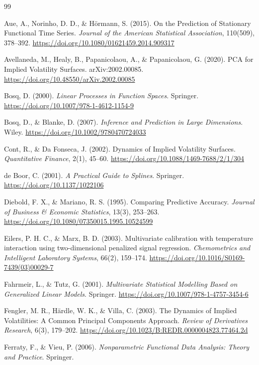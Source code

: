 \documentclass[12pt,a4paper]{article}
\begin{document}
\begin{thebibliography}{99}

Aue, A., Norinho, D. D., \& Hörmann, S. (2015). On the Prediction of Stationary Functional Time Series. \emph{Journal of the American Statistical Association}, 110(509), 378--392. \url{https://doi.org/10.1080/01621459.2014.909317}

Avellaneda, M., Healy, B., Papanicolaou, A., \& Papanicolaou, G. (2020). PCA for Implied Volatility Surfaces. arXiv:2002.00085. \url{https://doi.org/10.48550/arXiv.2002.00085}

Bosq, D. (2000). \emph{Linear Processes in Function Spaces}. Springer. \url{https://doi.org/10.1007/978-1-4612-1154-9}

Bosq, D., \& Blanke, D. (2007). \emph{Inference and Prediction in Large Dimensions}. Wiley. \url{https://doi.org/10.1002/9780470724033}

Cont, R., \& Da Fonseca, J. (2002). Dynamics of Implied Volatility Surfaces. \emph{Quantitative Finance}, 2(1), 45--60. \url{https://doi.org/10.1088/1469-7688/2/1/304}

de Boor, C. (2001). \emph{A Practical Guide to Splines}. Springer. \url{https://doi.org/10.1137/1022106}

Diebold, F. X., \& Mariano, R. S. (1995). Comparing Predictive Accuracy. \emph{Journal of Business \& Economic Statistics}, 13(3), 253--263. \url{https://doi.org/10.1080/07350015.1995.10524599}

Eilers, P. H. C., \& Marx, B. D. (2003). Multivariate calibration with temperature interaction using two-dimensional penalized signal regression. \emph{Chemometrics and Intelligent Laboratory Systems}, 66(2), 159--174. \url{https://doi.org/10.1016/S0169-7439(03)00029-7}

Fahrmeir, L., \& Tutz, G. (2001). \emph{Multivariate Statistical Modelling Based on Generalized Linear Models}. Springer. \url{https://doi.org/10.1007/978-1-4757-3454-6}

Fengler, M. R., Härdle, W. K., \& Villa, C. (2003). The Dynamics of Implied Volatilities: A Common Principal Components Approach. \emph{Review of Derivatives Research}, 6(3), 179--202. \url{https://doi.org/10.1023/B:REDR.0000004823.77464.2d}

Ferraty, F., \& Vieu, P. (2006). \emph{Nonparametric Functional Data Analysis: Theory and Practice}. Springer.


\end{thebibliography}
\end{document}
